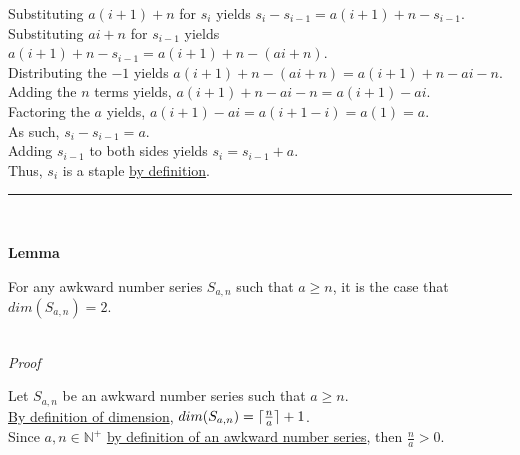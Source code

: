 \documentclass[a4paper,12pt]{article}
\DeclarePairedDelimiter{\ceil}{\lceil}{\rceil}
\begin{document}
\noindent Substituting $a(i + 1) + n$ for $s_i$ yields $s_i - s_{i - 1} = a(i + 1) + n - s_{i - 1}$.\\

\noindent Substituting $ai + n$ for $s_{i - 1}$ yields $a(i + 1) + n - s_{i - 1} = a(i + 1) + n - (ai + n)$.\\

\noindent Distributing the $-1$ yields $a(i + 1) + n - (ai + n) = a(i + 1) + n - ai - n$.\\

\noindent Adding the $n$ terms yields, $a(i + 1) + n - ai - n = a(i + 1) - ai$.\\

\noindent Factoring the $a$ yields, $a(i + 1) - ai = a(i + 1 - i) = a(1) = a$.\\

\noindent As such, $s_i - s_{i - 1} = a$.\\

\noindent Adding $s_{i - 1}$ to both sides yields $s_i = s_{i - 1} + a$.\\

\noindent Thus, $s_i$ is a staple \hyperlink{definition:staple}{by definition}.



\begin{center}
\noindent\rule{8cm}{0.4pt}
\end{center}
\noindent \\





\label{lemma:dimension_a_greater_equal_n}
\hypertarget{lemma:dimension_a_greater_equal_n}{}
\begin{tcolorbox}
\textbf{Lemma}

\noindent For any awkward number series $S_{a,n}$ such that $a \geq n$, it is the case that $dim(S_{a, n}) = 2$.

\end{tcolorbox}

\noindent \\
\textit{Proof}

\noindent Let $S_{a, n}$ be an awkward number series such that $a \geq n$.\\

\noindent \hyperlink{definition:dimension}{By definition of dimension}, $dim(S_{a,n}) = \ceil{\frac{n}{a}} + 1$.\\

\noindent Since $a, n \in \mathbb{N}^+$ \hyperlink{definition:awkward_number_series}{by definition of an awkward number series}, then $\frac{n}{a} > 0$.\\
\end{document}
